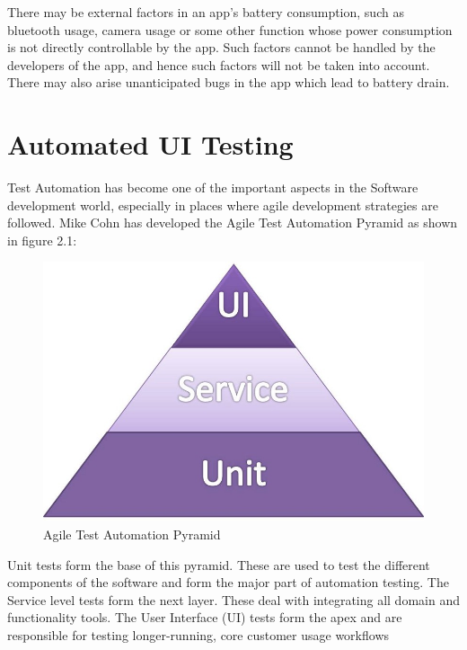 There may be external factors in an app’s battery consumption, such as bluetooth usage, camera usage or some other function whose power consumption is not directly controllable by the app. Such factors cannot be handled by the developers of the app, and hence such factors will not be taken into account. There may also arise unanticipated bugs in the app which lead to battery drain. 

\section{Automated UI Testing}
Test Automation has become one of the important aspects in the Software development world, especially in places where agile development strategies are followed. Mike Cohn has developed the Agile Test Automation Pyramid\cite{pyramid} as shown in figure 2.1:
\begin{figure}[!h]
 	\begin{center}
		\includegraphics[scale=0.5]{pyramid}
		\caption{Agile Test Automation Pyramid}
	\end{center}
\end{figure}

Unit tests form the base of this pyramid. These are used to test the different components of the software and form the major part of automation testing. The Service level tests form the next layer. These deal with integrating all domain and functionality tools. The User Interface (UI) tests form the apex and are responsible for testing longer-running, core customer usage workflows

